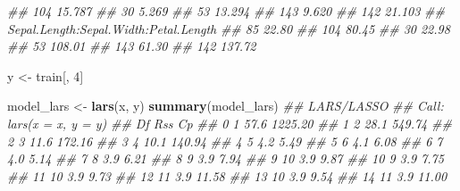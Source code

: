 \documentclass[
  notitlepage]{book}
\newenvironment{Shaded}{\begin{snugshade}}{\end{snugshade}}
\newcommand{\CommentTok}[1]{\textcolor[rgb]{0.56,0.35,0.01}{\textit{#1}}}
\newcommand{\DecValTok}[1]{\textcolor[rgb]{0.00,0.00,0.81}{#1}}
\newcommand{\KeywordTok}[1]{\textcolor[rgb]{0.13,0.29,0.53}{\textbf{#1}}}
\newcommand{\NormalTok}[1]{#1}
\newcommand{\StringTok}[1]{\textcolor[rgb]{0.31,0.60,0.02}{#1}}
\begin{document}
\begin{Shaded}
\begin{Highlighting}[]
\CommentTok{\#\# 104                   15.787}
\CommentTok{\#\# 30                     5.269}
\CommentTok{\#\# 53                    13.294}
\CommentTok{\#\# 143                    9.620}
\CommentTok{\#\# 142                   21.103}
\CommentTok{\#\#     Sepal.Length:Sepal.Width:Petal.Length}
\CommentTok{\#\# 85                                  22.80}
\CommentTok{\#\# 104                                 80.45}
\CommentTok{\#\# 30                                  22.98}
\CommentTok{\#\# 53                                 108.01}
\CommentTok{\#\# 143                                 61.30}
\CommentTok{\#\# 142                                137.72}
\end{Highlighting}
\end{Shaded}

\begin{Shaded}
\begin{Highlighting}[]
\NormalTok{y \textless{}{-}}\StringTok{ }\NormalTok{train[, }\DecValTok{4}\NormalTok{]}

\NormalTok{model\_lars \textless{}{-}}\StringTok{ }\KeywordTok{lars}\NormalTok{(x, y)}
\KeywordTok{summary}\NormalTok{(model\_lars)}
\CommentTok{\#\# LARS/LASSO}
\CommentTok{\#\# Call: lars(x = x, y = y)}
\CommentTok{\#\#    Df  Rss      Cp}
\CommentTok{\#\# 0   1 57.6 1225.20}
\CommentTok{\#\# 1   2 28.1  549.74}
\CommentTok{\#\# 2   3 11.6  172.16}
\CommentTok{\#\# 3   4 10.1  140.94}
\CommentTok{\#\# 4   5  4.2    5.49}
\CommentTok{\#\# 5   6  4.1    6.08}
\CommentTok{\#\# 6   7  4.0    5.14}
\CommentTok{\#\# 7   8  3.9    6.21}
\CommentTok{\#\# 8   9  3.9    7.94}
\CommentTok{\#\# 9  10  3.9    9.87}
\CommentTok{\#\# 10  9  3.9    7.75}
\CommentTok{\#\# 11 10  3.9    9.73}
\CommentTok{\#\# 12 11  3.9   11.58}
\CommentTok{\#\# 13 10  3.9    9.54}
\CommentTok{\#\# 14 11  3.9   11.00}
\end{Highlighting}
\end{Shaded}
\end{document}
